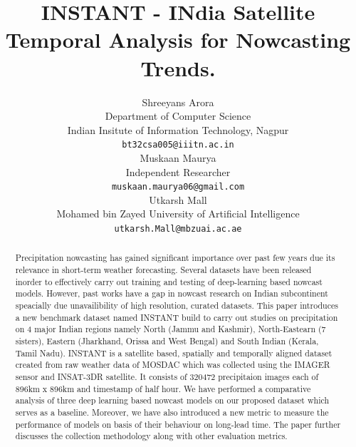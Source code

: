 \documentclass{article}
\title{INSTANT - INdia Satellite Temporal Analysis for Nowcasting Trends.}
\author{%
  Shreeyans Arora \\
  Department of Computer Science\\
  Indian Insitute of Information Technology, Nagpur\\
  \texttt{bt32csa005@iiitn.ac.in} \\
  \And
  Muskaan Maurya \\
  Independent Researcher \\
  \texttt{muskaan.maurya06@gmail.com} \\
  \And
  Utkarsh Mall \\
  Mohamed bin Zayed University of Artificial Intelligence \\
  \texttt{utkarsh.Mall@mbzuai.ac.ae} \\
}
\begin{document}
\maketitle


\begin{abstract}
  Precipitation nowcasting has gained significant importance over past few years due its relevance in short-term weather forecasting. 
  Several datasets have been released inorder to effectively carry out training and testing of deep-learning based nowcast models. 
  However, past works have a gap in nowcast research on Indian subcontinent speacially due unavailibility of high resolution, curated datasets. 
  This paper introduces a new benchmark dataset named INSTANT build to carry out studies on precipitation on 4 major Indian regions namely North (Jammu and Kashmir), North-Eastearn (7 sisters), Eastern (Jharkhand, Orissa and West Bengal) and South Indian (Kerala, Tamil Nadu). 
  INSTANT is a satellite based, spatially and temporally aligned dataset created from raw weather data of MOSDAC which was collected using the IMAGER sensor and INSAT-3DR satellite. 
  It consists of 320472 precipitaion images each of 896km x 896km  and timestamp of half hour.
  We have performed a comparative analysis of three deep learning based nowcast models on our proposed dataset which serves as a baseline. Moreover, we have also introduced a new metric to measure the performance of models on basis of their behaviour on long-lead time. 
  The paper further discusses the collection methodology along with other evaluation metrics.
\end{abstract}
\end{document}
